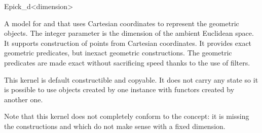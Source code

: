 \begin{ccRefClass}{Epick_d<dimension>}


\ccDefinition
A model for  and  that
uses Cartesian coordinates to represent the geometric objects.  The
integer parameter  is the dimension of the ambient
Euclidean space. It supports construction of points from 
Cartesian coordinates. It provides exact geometric predicates, but
inexact geometric constructions. The geometric predicates are made exact
without sacrificing speed thanks to the use of filters.

This kernel is default constructible and copyable. It does not carry any
state so it is possible to use objects created by one instance with
functors created by another one.

Note that this kernel does not completely conform to the 
concept: it is missing the constructions  and
 which do not make sense with a fixed
dimension.

\ccIsModel
{}


\ccSeeAlso
{}




\end{ccRefClass}
